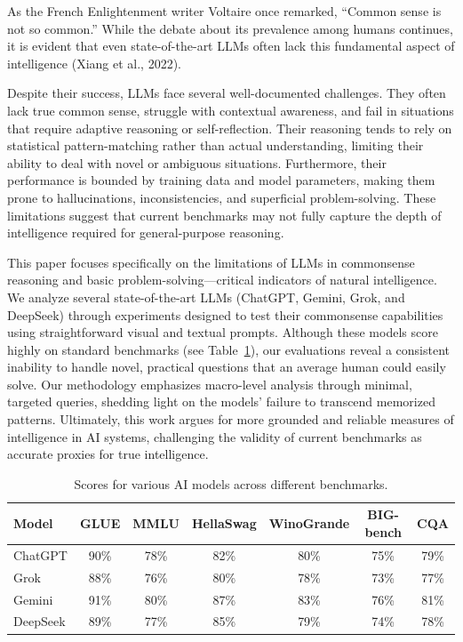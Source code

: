 \documentclass[11pt]{scrartcl}
\begin{document}
As the French Enlightenment writer Voltaire once remarked, ``Common sense is not so common.'' While the debate about its prevalence among humans continues, it is evident that even state-of-the-art LLMs often lack this fundamental aspect of intelligence (Xiang et al., 2022)\cite{ref10}.

Despite their success, LLMs face several well-documented challenges. They often lack true common sense, struggle with contextual awareness, and fail in situations that require adaptive reasoning or self-reflection. Their reasoning tends to rely on statistical pattern-matching rather than actual understanding, limiting their ability to deal with novel or ambiguous situations. Furthermore, their performance is bounded by training data and model parameters, making them prone to hallucinations, inconsistencies, and superficial problem-solving. These limitations suggest that current benchmarks may not fully capture the depth of intelligence required for general-purpose reasoning.

This paper focuses specifically on the limitations of LLMs in commonsense reasoning and basic problem-solving—critical indicators of natural intelligence. We analyze several state-of-the-art LLMs (ChatGPT, Gemini, Grok, and DeepSeek) through experiments designed to test their commonsense capabilities using straightforward visual and textual prompts. Although these models score highly on standard benchmarks (see Table~\ref{tab:benchmark_scores}), our evaluations reveal a consistent inability to handle novel, practical questions that an average human could easily solve. Our methodology emphasizes macro-level analysis through minimal, targeted queries, shedding light on the models' failure to transcend memorized patterns. Ultimately, this work argues for more grounded and reliable measures of intelligence in AI systems, challenging the validity of current benchmarks as accurate proxies for true intelligence. \\

\begin{table}[h]
\centering
\begin{tabular}{lcccccc}
\hline
Model     & GLUE & MMLU & HellaSwag & WinoGrande & BIG-bench & CQA \\
\hline
ChatGPT          & 90\% & 78\% & 82\%      & 80\%       & 75\%     & 79\%         \\
Grok             & 88\% & 76\% & 80\%      & 78\%       & 73\%     & 77\%         \\
Gemini           & 91\% & 80\% & 87\%      & 83\%       & 76\%     & 81\%         \\
DeepSeek         & 89\% & 77\% & 85\%      & 79\%       & 74\%     & 78\%         \\
\hline
\end{tabular}
\caption{Scores for various AI models across different benchmarks.}
\label{tab:benchmark_scores}
\end{table}
\end{document}
